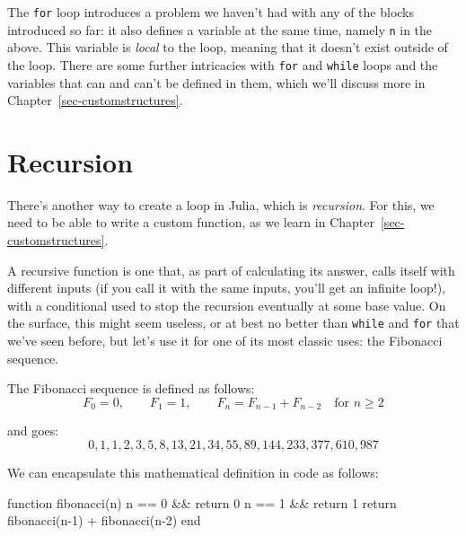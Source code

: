 \documentclass[
  letterpaper,
  DIV=11,
  numbers=noendperiod]{scrreprt}
\newenvironment{Shaded}{\begin{snugshade}}{\end{snugshade}}
\newcommand{\ControlFlowTok}[1]{\textcolor[rgb]{0.00,0.23,0.31}{#1}}
\newcommand{\FloatTok}[1]{\textcolor[rgb]{0.68,0.00,0.00}{#1}}
\newcommand{\FunctionTok}[1]{\textcolor[rgb]{0.28,0.35,0.67}{#1}}
\newcommand{\KeywordTok}[1]{\textcolor[rgb]{0.00,0.23,0.31}{#1}}
\newcommand{\NormalTok}[1]{\textcolor[rgb]{0.00,0.23,0.31}{#1}}
\newcommand{\OperatorTok}[1]{\textcolor[rgb]{0.37,0.37,0.37}{#1}}
\begin{document}
\begin{tcolorbox}[enhanced jigsaw, toprule=.15mm, opacitybacktitle=0.6, leftrule=.75mm, breakable, coltitle=black, bottomrule=.15mm, colbacktitle=quarto-callout-warning-color!10!white, bottomtitle=1mm, rightrule=.15mm, title=\textcolor{quarto-callout-warning-color}{\faExclamationTriangle}\hspace{0.5em}{Warning}, colframe=quarto-callout-warning-color-frame, left=2mm, colback=white, opacityback=0, arc=.35mm, toptitle=1mm, titlerule=0mm]

The \texttt{for} loop introduces a problem we haven't had with any of
the blocks introduced so far: it also defines a variable at the same
time, namely \texttt{n} in the above. This variable is \emph{local} to
the loop, meaning that it doesn't exist outside of the loop. There are
some further intricacies with \texttt{for} and \texttt{while} loops and
the variables that can and can't be defined in them, which we'll discuss
more in Chapter~\ref{sec-customstructures}.

\end{tcolorbox}

\hypertarget{recursion}{%
\section{Recursion}\label{recursion}}

There's another way to create a loop in Julia, which is
\emph{recursion}. For this, we need to be able to write a custom
function, as we learn in Chapter~\ref{sec-customstructures}.

A recursive function is one that, as part of calculating its answer,
calls itself with different inputs (if you call it with the same inputs,
you'll get an infinite loop!), with a conditional used to stop the
recursion eventually at some base value. On the surface, this might seem
useless, or at best no better than \texttt{while} and \texttt{for} that
we've seen before, but let's use it for one of its most classic uses:
the Fibonacci sequence.

The Fibonacci sequence is defined as follows: \[
F_0 = 0, \qquad F_1 = 1, \qquad F_n = F_{n-1} + F_{n-2} \quad \text{for } n \geqslant 2
\]

and goes: \[
0, 1, 1, 2, 3, 5, 8, 13, 21, 34, 55, 89, 144, 233, 377, 610, 987
\]

We can encapsulate this mathematical definition in code as follows:

\begin{Shaded}
\begin{Highlighting}[]
\KeywordTok{function} \FunctionTok{fibonacci}\NormalTok{(n)}
\NormalTok{    n }\OperatorTok{==} \FloatTok{0} \OperatorTok{\&\&} \ControlFlowTok{return} \FloatTok{0}
\NormalTok{    n }\OperatorTok{==} \FloatTok{1} \OperatorTok{\&\&} \ControlFlowTok{return} \FloatTok{1}
    \ControlFlowTok{return} \FunctionTok{fibonacci}\NormalTok{(n}\OperatorTok{{-}}\FloatTok{1}\NormalTok{) }\OperatorTok{+} \FunctionTok{fibonacci}\NormalTok{(n}\OperatorTok{{-}}\FloatTok{2}\NormalTok{)}
\KeywordTok{end}
\end{Highlighting}
\end{Shaded}
\end{document}
